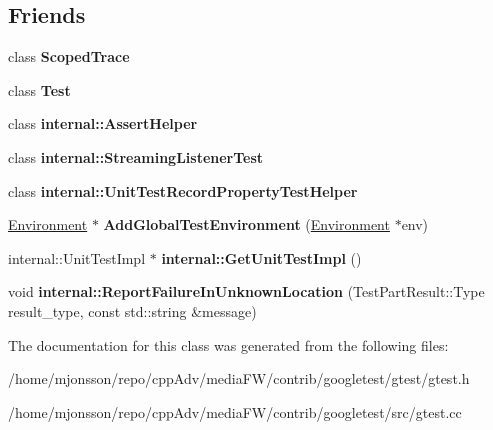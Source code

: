 \subsection*{Friends}
\begin{DoxyCompactItemize}
\item 
\mbox{\label{classtesting_1_1UnitTest_ada54bdd5bdc24f39b9ca16807326654a}} 
class {\bfseries Scoped\+Trace}
\item 
\mbox{\label{classtesting_1_1UnitTest_a5b78b1c2e1fa07ffed92da365593eaa4}} 
class {\bfseries Test}
\item 
\mbox{\label{classtesting_1_1UnitTest_a183151aa061362c87572e743fe233db1}} 
class {\bfseries internal\+::\+Assert\+Helper}
\item 
\mbox{\label{classtesting_1_1UnitTest_adc037d188dab349a94868991955c9cd4}} 
class {\bfseries internal\+::\+Streaming\+Listener\+Test}
\item 
\mbox{\label{classtesting_1_1UnitTest_ae970f89a9f477a349fe5778be85ef42e}} 
class {\bfseries internal\+::\+Unit\+Test\+Record\+Property\+Test\+Helper}
\item 
\mbox{\label{classtesting_1_1UnitTest_a5ec26e4c31220ff8e769cc09689a4d6d}} 
\hyperlink{classtesting_1_1Environment}{Environment} $\ast$ {\bfseries Add\+Global\+Test\+Environment} (\hyperlink{classtesting_1_1Environment}{Environment} $\ast$env)
\item 
\mbox{\label{classtesting_1_1UnitTest_a56e56be7066957d612e53b5c60f6ac08}} 
internal\+::\+Unit\+Test\+Impl $\ast$ {\bfseries internal\+::\+Get\+Unit\+Test\+Impl} ()
\item 
\mbox{\label{classtesting_1_1UnitTest_a73f5a158c13793b90c80d854c9a75120}} 
void {\bfseries internal\+::\+Report\+Failure\+In\+Unknown\+Location} (Test\+Part\+Result\+::\+Type result\+\_\+type, const std\+::string \&message)
\end{DoxyCompactItemize}


The documentation for this class was generated from the following files\+:\begin{DoxyCompactItemize}
\item 
/home/mjonsson/repo/cpp\+Adv/media\+F\+W/contrib/googletest/gtest/gtest.\+h\item 
/home/mjonsson/repo/cpp\+Adv/media\+F\+W/contrib/googletest/src/gtest.\+cc\end{DoxyCompactItemize}
